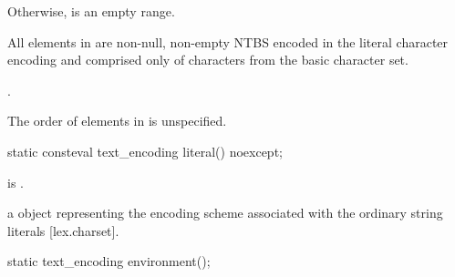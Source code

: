 \documentclass{wg21}
\begin{document}
\begin{addedblock}
\begin{itemdescr}
Otherwise,  is an empty range.

All elements in  are non-null, non-empty NTBS encoded in the literal character encoding and comprised only of characters from the basic character set.

\returns {}.

\begin{note}
The order of elements in  is unspecified.
\end{note}

\end{itemdescr}

\begin{itemdecl}
static consteval text_encoding literal() noexcept;
\end{itemdecl}
\begin{itemdescr}
 
\mandates {} is .   
    
\returns a  object representing the encoding scheme associated with the ordinary string literals [lex.charset].

\end{itemdescr}

%
%
%    
%
%



\begin{itemdecl}
static text_encoding environment();
\end{itemdecl}


\begin{itemdescr}


\end{itemdescr}
\end{addedblock}
\end{document}
